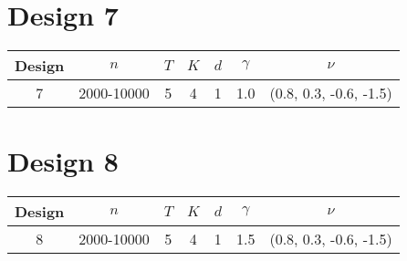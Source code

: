 \documentclass[11pt,letterpaper]{article}
\begin{document}


\section{Design 7}

\begin{table}
\begin{tabular}{ccccccc}
\hline\hline
Design & $n$          & $T$ & $K$ & $d$ & $\gamma$ & $\nu$ \\
\hline
7      & 2000-10000   & 5   & 4   & 1   & 1.0      & (0.8, 0.3, -0.6, -1.5)\\
\hline\hline
\end{tabular}
\end{table}



\section{Design 8}

\begin{table}
\begin{tabular}{ccccccc}
\hline\hline
Design & $n$          & $T$ & $K$ & $d$ & $\gamma$ & $\nu$ \\
\hline
8      & 2000-10000   & 5   & 4   & 1   & 1.5      & (0.8, 0.3, -0.6, -1.5)\\
\hline\hline
\end{tabular}
\end{table}

\end{document}
